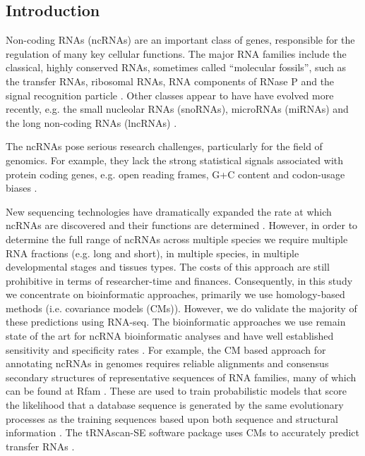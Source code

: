\documentclass[10pt]{bmc_article}
\newenvironment{bmcformat}{\begin{raggedright}\baselineskip20pt\sloppy\setboolean{publ}{false}}{\end{raggedright}\baselineskip20pt\sloppy}
\begin{document}
\begin{bmcformat}

\section*{Introduction}

Non-coding RNAs (ncRNAs) are an important class of genes, responsible
for the regulation of many key cellular functions. The major RNA
families include the classical, highly conserved RNAs, sometimes
called ``molecular fossils'', such as the transfer RNAs, ribosomal
RNAs, RNA components of RNase P and the signal recognition particle
\cite{Jeffares:1998}. Other classes appear to have have evolved more
recently, e.g. the small nucleolar RNAs (snoRNAs), microRNAs (miRNAs)
and the long non-coding RNAs (lncRNAs) \cite{Hoeppner:2012}.


The ncRNAs pose serious research challenges, particularly for the
field of genomics. For example, they lack the strong statistical
signals associated with protein coding genes, e.g. open reading
frames, G+C content and codon-usage biases \cite{Rivas:2000}. 

New sequencing technologies have dramatically expanded the rate at
which ncRNAs are discovered and their functions are determined
\cite{cech2014noncoding}. However, in order to determine the full
range of ncRNAs across multiple species we require multiple RNA
fractions (e.g. long and short), in multiple species, in multiple
developmental stages and tissues types. The costs of this approach are
still prohibitive in terms of researcher-time and
finances. Consequently, in this study we concentrate on bioinformatic
approaches, primarily we use homology-based methods (i.e. covariance models
(CMs)). However, we do validate the majority of these predictions
using RNA-seq. The bioinformatic approaches we use remain state of the art for ncRNA bioinformatic
analyses \cite{Sakakibara:1994,Eddy:1994,Nawrocki:2009} and have well
established sensitivity and specificity rates \cite{Freyhult:2007}.
For example, the CM based approach for annotating ncRNAs in genomes requires
reliable alignments and consensus secondary structures of
representative sequences of RNA families, many of which can be found
at Rfam
\cite{Griffiths-Jones:2003,Griffiths-Jones:2005,Gardner:2009,Gardner:2011a,Burge:2013}. These
are used to train probabilistic models that score the likelihood that
a database sequence is generated by the same evolutionary processes as
the training sequences based upon both sequence and structural
information \cite{Sakakibara:1994,Eddy:1994,Nawrocki:2009}.  The
tRNAscan-SE software package uses CMs to accurately predict transfer
RNAs \cite{Lowe:1997,Chan:2009}.


\end{bmcformat}
\end{document}
